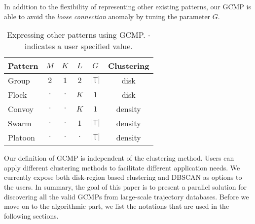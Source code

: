 In addition to the flexibility of representing other existing patterns, our GCMP is able to avoid the \emph{loose connection} anomaly by tuning the parameter $G$. 
\begin{table}[h]
\centering
\begin{tabular}{|l|c|c|c|c|c|}
\hline 
\textbf{Pattern} & $M$ & $K$ & $L$ & $G$ & \textbf{Clustering} \\ 
\hline
Group & $2$ & $1$ & $2$ & $|\mathbb{T}|$ & disk\\
\hline
Flock & $\cdot$ & $\cdot$ & $K$ & $1$ & disk \\
\hline 
Convoy & $\cdot$ & $\cdot$ & $K$ & $1$ & density\\ 
\hline 
Swarm & $\cdot$ & $\cdot$ & $1$ & $|\mathbb{T}|$ & density\\ 
\hline 
Platoon & $\cdot$ & $\cdot$ & $\cdot$ & $|\mathbb{T}|$ & density\\  
\hline 
\end{tabular} 
    \vspace{-0.5em}
\caption{Expressing other patterns using GCMP. $\cdot$ indicates a user specified value.
}
    \vspace{-0.5em}
\label{tbl:patterns}
\end{table}

Our definition of GCMP is independent of the clustering method. Users can apply different clustering methods to facilitate different application needs. 
We currently expose both disk-region based clustering and DBSCAN as options to the users. In summary, the goal of this paper is to present a parallel solution for discovering all the valid GCMPs from large-scale trajectory databases. Before we move on to the algorithmic part, we list the notations that are used in the following sections.

